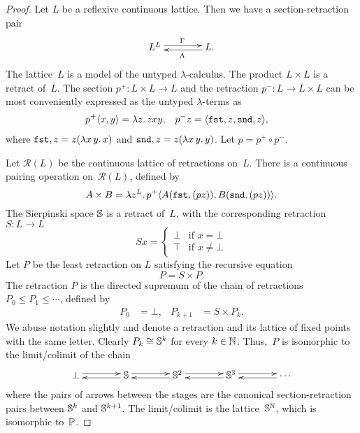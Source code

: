 \begin{proof}
  \newcommand{\retr}[1]{\mathscr{R}(#1)}
  Let $L$ be a reflexive continuous lattice. Then we have a
  section-retraction pair
  \begin{equation*}
    \xymatrix@+1.5em{
      {L^L} \ar@<0.5ex>[r]^{\Gamma} &
      {L} \ar@<0.5ex>[l]^{\Lambda}.
      }
  \end{equation*}
  The lattice~$L$ is a model of the untyped $\lambda$-calculus.
  The product $L \times L$ is a retract of~$L$. The section $p^{+}: L
  \times L \to L$ and the retraction $p^{-}: L \to L \times L$ can
  be most conveniently expressed as the untyped $\lambda$-terms as
  \begin{align*}
    p^{+} \langle x, y \rangle &= \lambda z .\,z x y,
    &
    p^{-} z &= \langle \mathtt{fst},z, \mathtt{snd},z \rangle,
  \end{align*}
  where $\mathtt{fst},z = z (\lambda x \, y .\,x)$ and $\mathtt{snd},z = z (\lambda x \,
    y .\,y)$. Let $p = p^{+} \circ p^{-}$.
  
  Let $\retr{L}$ be the continuous lattice of retractions on~$L$.
  There is a continuous pairing operation on~$\retr{L}$, defined by
  \begin{equation*}
    A \times B =
    \lambda z^{L} .\,p^{+} \langle 
       A (\mathtt{fst},(p z)),
       B (\mathtt{snd},(p z)) \rangle.
  \end{equation*}
  The Sierpinski space $\mathbb{S}$ is a retract of~$L$, with the
  corresponding retraction $S: L \to L$
  \begin{equation*}
    S x = 
    \begin{cases}
      \bot & \text{if $x = \bot$} \\
      \top & \text{if $x \neq \bot$}
    \end{cases}
  \end{equation*}
  Let $P$ be the least retraction on $L$ satisfying the recursive
  equation
  \begin{equation*}
    P = S \times P.
  \end{equation*}
  The retraction $P$ is the directed supremum of the chain of
  retractions $P_0 \leq P_1 \leq \cdots$, defined by
  \begin{align*}
    P_0 &= \bot,
    &
    P_{k+1} &= S \times P_k.
  \end{align*}
  We abuse notation slightly and denote a retraction and its lattice
  of fixed points with the same letter. Clearly $P_k \cong
  \mathbb{S}^k$ for every $k \in \mathbb{N}$. Thus,~$P$ is isomorphic to the
  limit/colimit of the chain
  \begin{equation*}
    \xymatrix@+1.5em{
      {\bot} \ar@<0.5ex>[r] &
      {\Sierpinski} \ar@<0.5ex>[l] \ar@<0.5ex>[r] &
      {\Sierpinski^2} \ar@<0.5ex>[l] \ar@<0.5ex>[r] &
      {\Sierpinski^3} \ar@<0.5ex>[l] \ar@<0.5ex>[r] &
      {\cdots} \ar@<0.5ex>[l],
    }
  \end{equation*}
  where the pairs of arrows between the stages are the canonical
  section-retraction pairs between $\mathbb{S}^k$ and
  $\mathbb{S}^{k+1}$.  The limit/colimit is the
  lattice~$\mathbb{S}^{\mathbb{N}}$, which is isomorphic to~$\mathbb{P}$.
\end{proof}

